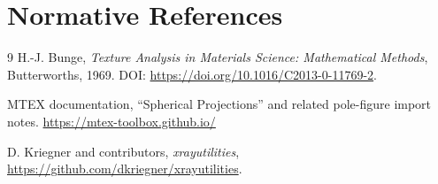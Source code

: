 \documentclass[11pt]{article}
\begin{document}
\section{Normative References}

\begin{thebibliography}{9}
H.-J. Bunge,
\textit{Texture Analysis in Materials Science: Mathematical Methods},
Butterworths, 1969.
DOI: \url{https://doi.org/10.1016/C2013-0-11769-2}.

MTEX documentation,
``Spherical Projections'' and related pole-figure import notes.
\url{https://mtex-toolbox.github.io/}

D. Kriegner and contributors,
\textit{xrayutilities},
\url{https://github.com/dkriegner/xrayutilities}.
\end{thebibliography}
\end{document}
